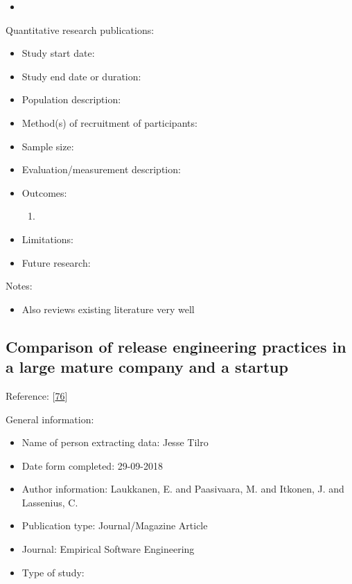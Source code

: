 \documentclass[]{book}
\providecommand{\tightlist}{%
  \setlength{\itemsep}{0pt}\setlength{\parskip}{0pt}}
\begin{document}
\begin{itemize}
\item
\end{itemize}

Quantitative research publications:

\begin{itemize}
\tightlist
\item
  Study start date:
\item
  Study end date or duration:
\item
  Population description:
\item
  Method(s) of recruitment of participants:
\item
  Sample size:
\item
  Evaluation/measurement description:
\item
  Outcomes:

  \begin{enumerate}
  \def\labelenumi{\arabic{enumi}.}
  \item
  \end{enumerate}
\item
  Limitations:
\item
  Future research:
\end{itemize}

Notes:

\begin{itemize}
\tightlist
\item
  Also reviews existing literature very well
\end{itemize}

\subsection{Comparison of release engineering practices in a large
mature company and a
startup}\label{comparison-of-release-engineering-practices-in-a-large-mature-company-and-a-startup}

Reference: {[}\protect\hyperlink{ref-laukkanen2018a}{76}{]}

General information:

\begin{itemize}
\tightlist
\item
  Name of person extracting data: Jesse Tilro
\item
  Date form completed: 29-09-2018
\item
  Author information: Laukkanen, E. and Paasivaara, M. and Itkonen, J.
  and Lassenius, C.
\item
  Publication type: Journal/Magazine Article
\item
  Journal: Empirical Software Engineering
\item
  Type of study:
\end{itemize}
\end{document}
